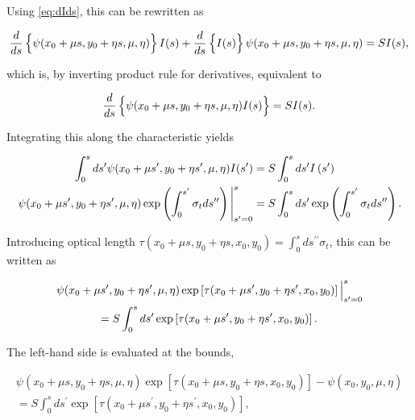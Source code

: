\documentclass{midterm-template}
\begin{document}
Using \autoref{eq:dIds}, this can be rewritten as

\begin{equation}
    \frac{d}{ds} \left\{ \psi(x_0 + \mu s, y_0 + \eta s, \mu, \eta)  \vphantom{\frac{}{}} \right\}I(s)
     + \frac{d}{ds} \left\{ I(s) \vphantom{\frac{}{}} \right\} \psi(x_0 + \mu s, y_0 + \eta s, \mu, \eta)  = S I(s),
\end{equation}

which is, by inverting product rule for derivatives, equivalent to 

\begin{equation}
    \frac{d}{ds} \left\{ \psi(x_0 + \mu s, y_0 + \eta s, \mu, \eta)  \vphantom{\frac{}{}} I(s) \right\}  = S I(s).
\end{equation}

Integrating this along the characteristic yields

\begin{align}
    \int_0^s ds^\prime \psi(x_0 + \mu s^\prime, y_0 + \eta s^\prime, \mu, \eta) I(s^\prime)& = S\int_0^s ds^\prime I\left(s^\prime\right)\\
     \left.\psi(x_0 + \mu s^\prime, y_0 + \eta s^\prime, \mu, \eta) \exp\left( \int_0^{s^\prime} \sigma_t ds^{\prime \prime} \right) \vphantom{\frac{}{}}\right|_{s^\prime = 0}^s &= S\int_0^s ds^\prime \exp\left( \int_0^{s^\prime} \sigma_t ds^{\prime \prime} \right).
\end{align}

Introducing optical length $\tau(x_0+\mu s, y_0+ \eta s, x_0, y_0) = \int_0^s ds^{\prime\prime}\sigma_t$, this can be written as

\begin{multline}
    \left.\psi(x_0 + \mu s^\prime, y_0 + \eta s^\prime, \mu, \eta) \exp\left[ \tau(x_0+\mu s^\prime, y_0+ \eta s^\prime, x_0, y_0) \right] \vphantom{\frac{}{}}\right|_{s^\prime = 0}^s \\
    = S\int_0^s ds^\prime \exp\left[ \tau(x_0+\mu s^\prime, y_0+ \eta s^\prime, x_0, y_0) \right].
\end{multline}

The left-hand side is evaluated at the bounds,

\begin{multline}
    \psi(x_0 + \mu s, y_0 + \eta s, \mu, \eta) \exp\left[ \tau(x_0+\mu s, y_0+ \eta s, x_0, y_0) \right] - \psi(x_0, y_0, \mu, \eta) \\
    = S\int_0^s ds^\prime \exp\left[ \tau(x_0+\mu s^\prime, y_0+ \eta s^\prime, x_0, y_0) \right],
\end{multline}
\end{document}
